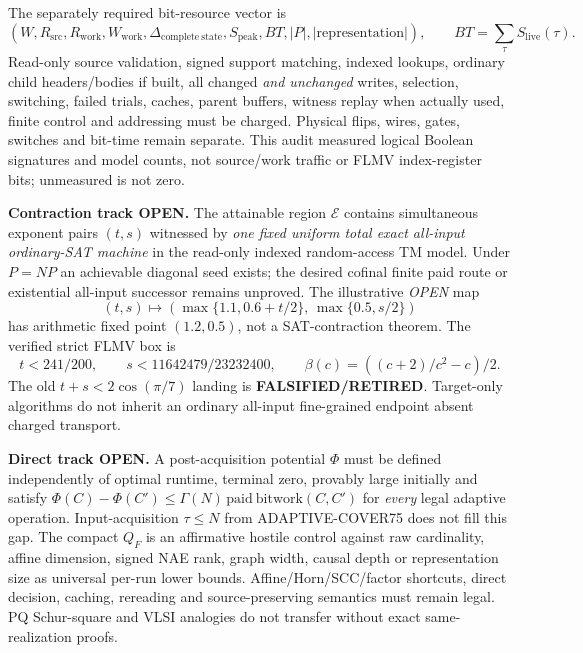 \documentclass[11pt]{article}
\begin{document}
The separately required bit-resource vector is
\[
(W,R_{\mathrm{src}},R_{\mathrm{work}},W_{\mathrm{work}},
\Delta_{\mathrm{complete\ state}},S_{\mathrm{peak}},
BT,|P|,|\mathrm{representation}|),\qquad
BT=\sum_\tau S_{\mathrm{live}}(\tau).
\]
Read-only source validation, signed support matching, indexed lookups, ordinary child headers/bodies if built, all changed \emph{and unchanged} writes, selection, switching, failed trials, caches, parent buffers, witness replay when actually used, finite control and addressing must be charged. Physical flips, wires, gates, switches and bit-time remain separate. This audit measured logical Boolean signatures and model counts, not source/work traffic or FLMV index-register bits; unmeasured is not zero.

\textbf{Contraction track OPEN.} The attainable region $\mathcal E$ contains simultaneous exponent pairs $(t,s)$ witnessed by \emph{one fixed uniform total exact all-input ordinary-SAT machine} in the read-only indexed random-access TM model. Under $P=NP$ an achievable diagonal seed exists; the desired cofinal finite paid route or existential all-input successor remains unproved. The illustrative \emph{OPEN} map
\[
(t,s)\longmapsto(\max\{1.1,0.6+t/2\},\,\max\{0.5,s/2\})
\]
has arithmetic fixed point $(1.2,0.5)$, not a SAT-contraction theorem. The verified strict FLMV box is
\[
t<241/200,\qquad s<11642479/23232400,\qquad
\beta(c)=((c+2)/c^2-c)/2.
\]
The old $t+s<2\cos(\pi/7)$ landing is \textbf{FALSIFIED/RETIRED}. Target-only algorithms do not inherit an ordinary all-input fine-grained endpoint absent charged transport.

\textbf{Direct track OPEN.} A post-acquisition potential $\Phi$ must be defined independently of optimal runtime, terminal zero, provably large initially and satisfy $\Phi(C)-\Phi(C')\le\Gamma(N)\,\mathrm{paid\ bitwork}(C,C')$ for \emph{every} legal adaptive operation. Input-acquisition $\tau\le N$ from ADAPTIVE-COVER75 does not fill this gap. The compact $Q_F$ is an affirmative hostile control against raw cardinality, affine dimension, signed NAE rank, graph width, causal depth or representation size as universal per-run lower bounds. Affine/Horn/SCC/factor shortcuts, direct decision, caching, rereading and source-preserving semantics must remain legal. PQ Schur-square and VLSI analogies do not transfer without exact same-realization proofs.
\end{document}
